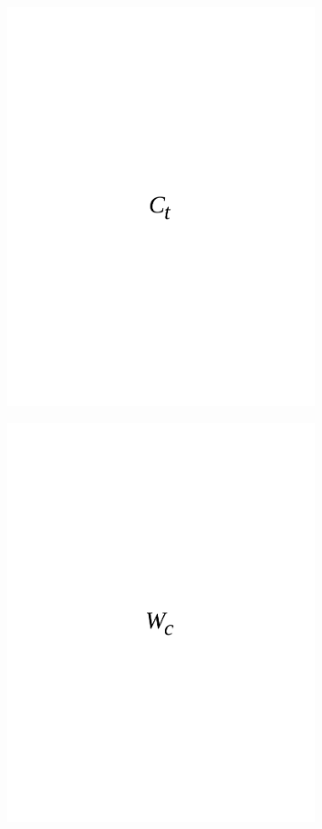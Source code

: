 \begin{figure}[H]
	\centering
	\includegraphics[width=0.8\textwidth]{media/ict/image57}
	\caption*{}
\end{figure}

\begin{figure}[H]
	\centering
	\includegraphics[width=0.8\textwidth]{media/ict/image58}
	\caption*{}
\end{figure}

